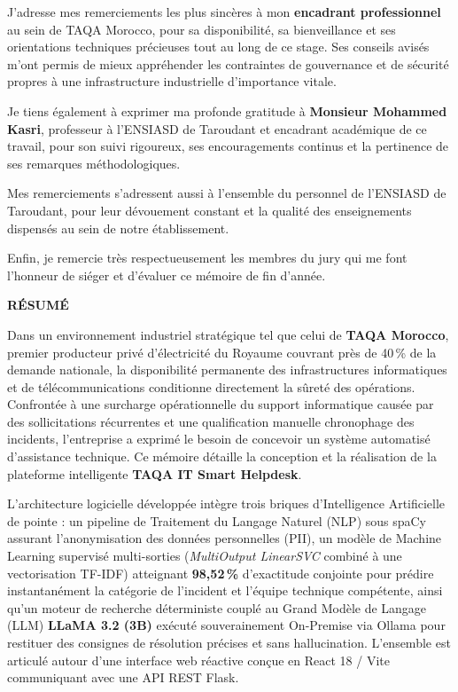 \documentclass[12pt, a4paper, oneside]{report}
\begin{document}
J'adresse mes remerciements les plus sincères à mon \textbf{encadrant professionnel} au sein de TAQA Morocco, pour sa disponibilité, sa bienveillance et ses orientations techniques précieuses tout au long de ce stage. Ses conseils avisés m'ont permis de mieux appréhender les contraintes de gouvernance et de sécurité propres à une infrastructure industrielle d'importance vitale.

Je tiens également à exprimer ma profonde gratitude à \textbf{Monsieur Mohammed Kasri}, professeur à l'ENSIASD de Taroudant et encadrant académique de ce travail, pour son suivi rigoureux, ses encouragements continus et la pertinence de ses remarques méthodologiques.

Mes remerciements s'adressent aussi à l'ensemble du personnel de l'ENSIASD de Taroudant, pour leur dévouement constant et la qualité des enseignements dispensés au sein de notre établissement.

Enfin, je remercie très respectueusement les membres du jury qui me font l'honneur de siéger et d'évaluer ce mémoire de fin d'année.

\newpage
{}
\begin{flushright}
  \textbf{\Large RÉSUMÉ}
\end{flushright}

\vspace{0.6cm}

Dans un environnement industriel stratégique tel que celui de \textbf{TAQA Morocco}, premier producteur privé d'électricité du Royaume couvrant près de 40\,\% de la demande nationale, la disponibilité permanente des infrastructures informatiques et de télécommunications conditionne directement la sûreté des opérations. Confrontée à une surcharge opérationnelle du support informatique causée par des sollicitations récurrentes et une qualification manuelle chronophage des incidents, l'entreprise a exprimé le besoin de concevoir un système automatisé d'assistance technique. Ce mémoire détaille la conception et la réalisation de la plateforme intelligente \textbf{TAQA IT Smart Helpdesk}.

L'architecture logicielle développée intègre trois briques d'Intelligence Artificielle de pointe : un pipeline de Traitement du Langage Naturel (NLP) sous spaCy assurant l'anonymisation des données personnelles (PII), un modèle de Machine Learning supervisé multi-sorties (\textit{MultiOutput LinearSVC} combiné à une vectorisation TF-IDF) atteignant \textbf{98,52\,\%} d'exactitude conjointe pour prédire instantanément la catégorie de l'incident et l'équipe technique compétente, ainsi qu'un moteur de recherche déterministe couplé au Grand Modèle de Langage (LLM) \textbf{LLaMA 3.2 (3B)} exécuté souverainement On-Premise via Ollama pour restituer des consignes de résolution précises et sans hallucination. L'ensemble est articulé autour d'une interface web réactive conçue en React 18 / Vite communiquant avec une API REST Flask.
\end{document}
